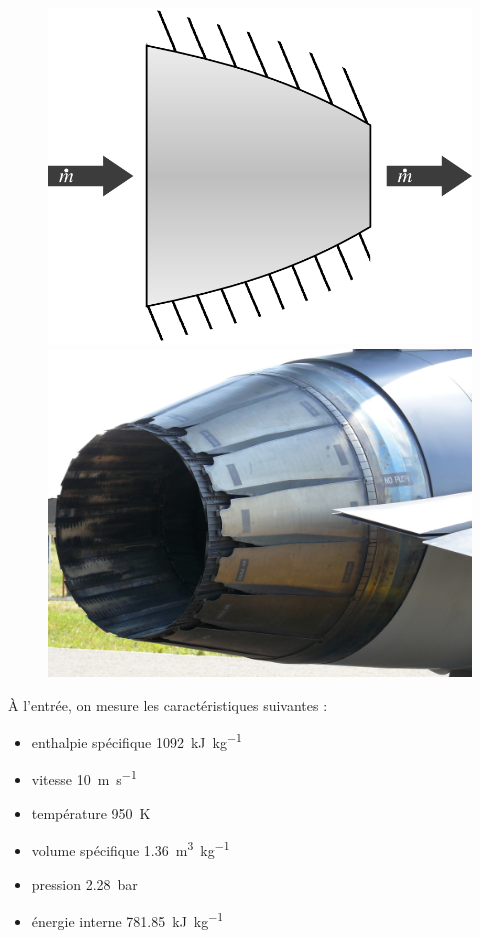 	\begin{figure}
		\begin{center}
			\includegraphics[height=0.35\textwidth, max height=0.5\columnwidth]{images/symbole_tuyere.png}
			\hspace{0.3cm}
			\includegraphics[height=0.35\textwidth, max height=0.5\columnwidth]{images/nozzle_f100.jpg}
		\end{center}
		\label{fig_nozzle}
	\end{figure}

	
	À l’entrée, on mesure les caractéristiques suivantes :
		
	\begin{itemize}
		\item enthalpie spécifique 		\tab \SI{1092}{\kilo\joule\per\kilogram}
		\item vitesse 							\tab \SI{10}{\metre\per\second}
		\item température 					\tab \SI{950}{\kelvin}
		\item volume spécifique 			\tab \SI{1,36}{\metre\cubed\per\kilogram}
		\item pression 						\tab \SI{2,28}{\bar}
		\item énergie interne 				\tab \SI{781,85}{\kilo\joule\per\kilogram}
	\end{itemize}

